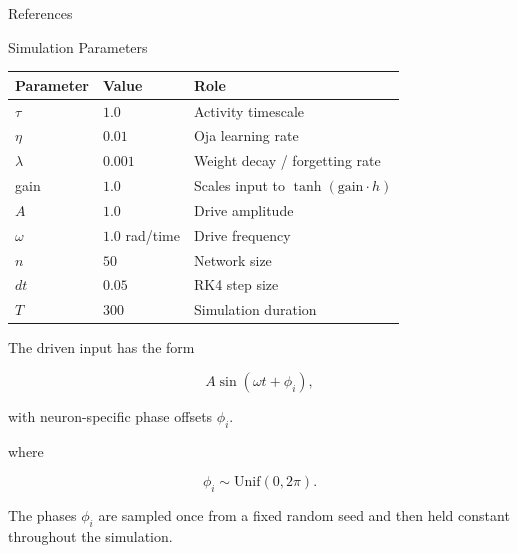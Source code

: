 \documentclass[
11pt,notheorems,hyperref={pdfauthor=whatever}
]{beamer}
\begin{document}
\begin{frame}{References}
\nocite{*}
\printbibliography
\end{frame}

\begin{frame}{Simulation Parameters}
\small

\begin{center}
\begin{tabular}{lll}
\hline
\textbf{Parameter} & \textbf{Value} & \textbf{Role} \\
\hline
\(\tau\) & \(1.0\) & Activity timescale \\
\(\eta\) & \(0.01\) & Oja learning rate \\
\(\lambda\) & \(0.001\) & Weight decay / forgetting rate \\
gain & \(1.0\) & Scales input to \(\tanh(\text{gain}\cdot h)\) \\
\(A\) & \(1.0\) & Drive amplitude \\
\(\omega\) & \(1.0\) rad/time & Drive frequency \\
\(n\) & \(50\) & Network size \\
\(dt\) & \(0.05\) & RK4 step size \\
\(T\) & \(300\) & Simulation duration \\
\hline
\end{tabular}
\end{center}

\vspace{0.7em}

The driven input has the form

\[
A\sin(\omega t+\phi_i),
\]

with neuron-specific phase offsets \(\phi_i\).

where

\[
\phi_i\sim \mathrm{Unif}(0,2\pi).
\]

The phases \(\phi_i\) are sampled once from a fixed random seed and then held
constant throughout the simulation.

\end{frame}
\end{document}
